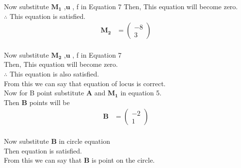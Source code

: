 \documentclass[10pt,a4paper]{report}
\newcommand{\myvec}[1]{\ensuremath{\begin{pmatrix}#1\end{pmatrix}}}
\let\vec\mathbf
\begin{document}
\begin{multicols}{2}
Now substitute $\vec{M_1}$  ,$\vec{u}$ , f in Equation 7
\vspace{0.25cm}
Then, This equation will become zero.
\vspace{0.25cm}\\
$\therefore$ This equation is satisfied.
\begin{align} 
\vec{M_2} &= \myvec{-8 \\ 3} 
\end{align}
\vspace{0.25cm}\\
Now substitute $\vec{M_2}$  ,$\vec{u}$ , f in Equation 7
\vspace{0.25cm}\\
Then, This equation will become zero.
\vspace{0.25cm}\\
$\therefore$ This equation is also satisfied.
\vspace{0.25cm}\\
From this we can say that equation of locus is correct.
\vspace{0.25cm}\\
Now for B point substitute $\vec{A}$ and $\vec{M_1}$ in equation 5.
\vspace{0.25cm}\\
Then $\vec{B}$ points will be
\begin{align} 
\vec{B} &= \myvec{-2 \\ 1} 
\end{align}
\vspace{0.25cm}\\
Now substitute $\vec{B}$ in circle equation 
\vspace{0.25cm}\\
Then equation is satisfied.
\vspace{0.25cm}\\
From this we can say that $\vec{B}$ is point on the circle.

\end{multicols}
\end{document}
